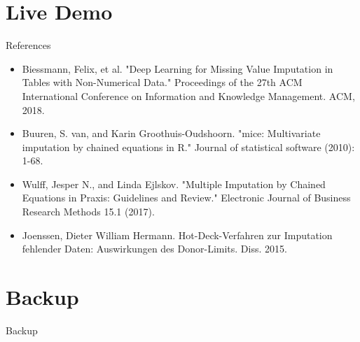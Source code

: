 \documentclass[aspectratio=43]{beamer}
\begin{document}
\section{Live Demo}

\appendix
\begin{frame}{References}
\scriptsize
\begin{itemize}
	\item Biessmann, Felix, et al. "Deep Learning for Missing Value Imputation in Tables with Non-Numerical Data." Proceedings of the 27th ACM International Conference on Information and Knowledge Management. ACM, 2018.
	\item Buuren, S. van, and Karin Groothuis-Oudshoorn. "mice: Multivariate imputation by chained equations in R." Journal of statistical software (2010): 1-68.
	\item Wulff, Jesper N., and Linda Ejlskov. "Multiple Imputation by Chained Equations in Praxis: Guidelines and Review." Electronic Journal of Business Research Methods 15.1 (2017).
	\item Joenssen, Dieter William Hermann. Hot-Deck-Verfahren zur Imputation fehlender Daten: Auswirkungen des Donor-Limits. Diss. 2015.
\end{itemize}
\end{frame}

\section{Backup}

\begin{frame}{Backup}
\end{frame}
\end{document}
